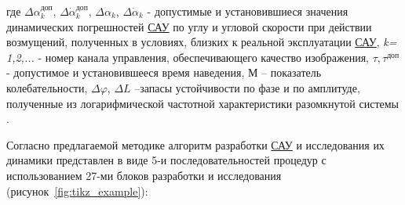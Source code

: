 где $\varDelta \alpha^{\textit{доп}}_{k}$, 
$\varDelta \dot{\alpha}^{\textit{доп}}_{k}$, 
$\varDelta \alpha _k$, 
$\varDelta \dot{\alpha}_k$ 
- допустимые и установившиеся значения динамических погрешностей \hyperref[acroSAU]{САУ} по углу и угловой скорости при действии возмущений, полученных в условиях, близких к реальной эксплуатации \hyperref[acroSAU]{САУ}, \textit{k= 1,2,...} - номер канала управления, обеспечивающего качество изображения, $\tau, \tau^\textit{доп}$ - допустимое и установившееся время наведения, М – показатель колебательности, $\varDelta \varphi$, $\varDelta L$ –запасы устойчивости по фазе и по амплитуде, полученные из логарифмической частотной характеристики разомкнутой системы \cite[]{Bessekerski20}.

Согласно предлагаемой методике алгоритм разработки \hyperref[acroSAU]{САУ} и исследования их динамики представлен в виде 5-и последовательностей процедур с использованием 27-ми блоков разработки и исследования (рисунок~\ref{fig:tikz_example}):


